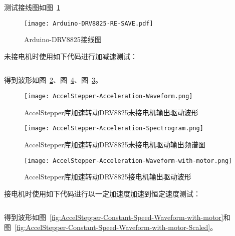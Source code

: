测试接线图如图~\ref{fig:Arduino-DRV8825}

\begin{figure}[htbp]
    \centering
    \texttt{[image: Arduino-DRV8825-RE-SAVE.pdf]}
    \caption{Arduino-DRV8825接线图}
    \label{fig:Arduino-DRV8825}
\end{figure}



未接电机时使用如下代码进行加减速测试：

\inputminted[mathescape, linenos, breaklines]{C}{Code/Stepper-3/Stepper-3.ino}

得到波形如图~\ref{fig:AccelStepper-Acceleration-Waveform}、图~\ref{fig:AccelStepper-Acceleration-Waveform-with-motor}、图~\ref{fig:AccelStepper-Acceleration-Spectrogram}。

\begin{figure}[htbp]
    \centering
    \texttt{[image: AccelStepper-Acceleration-Waveform.png]}
    \caption{AccelStepper库加速转动DRV8825未接电机输出驱动波形}
    \label{fig:AccelStepper-Acceleration-Waveform}
\end{figure}

\begin{figure}[htbp]
    \centering
    \texttt{[image: AccelStepper-Acceleration-Spectrogram.png]}
    \caption{AccelStepper库加速转动DRV8825未接电机驱动输出频谱图}
    \label{fig:AccelStepper-Acceleration-Spectrogram}
\end{figure}

\begin{figure}[htbp]
    \centering
    \texttt{[image: AccelStepper-Acceleration-Waveform-with-motor.png]}
    \caption{AccelStepper库加速转动DRV8825接电机输出驱动波形}
    \label{fig:AccelStepper-Acceleration-Waveform-with-motor}
\end{figure}

接电机时使用如下代码进行以一定加速度加速到恒定速度测试：

\inputminted[mathescape, linenos, breaklines]{C}{Code/Stepper-3/Stepper-3.ino}

得到波形如图~\ref{fig:AccelStepper-Constant-Speed-Waveform-with-motor}和图~\ref{fig:AccelStepper-Constant-Speed-Waveform-with-motor-Scaled}。

